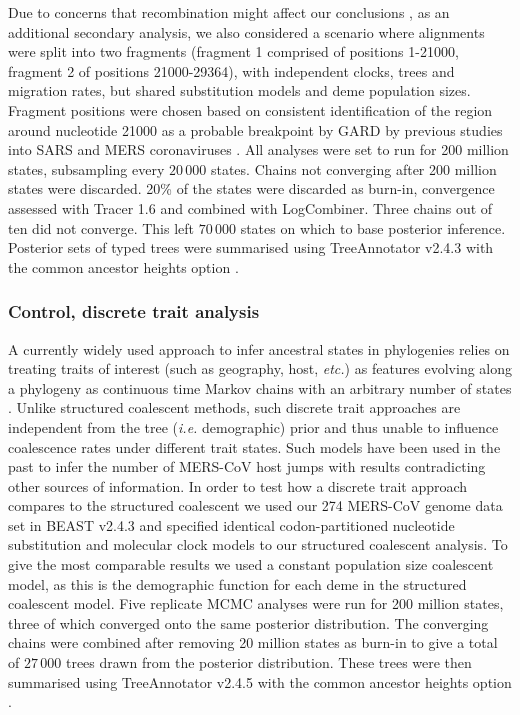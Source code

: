 \documentclass[11pt,oneside,letterpaper]{article}
\begin{document}
Due to concerns that recombination might affect our conclusions \citep{dudas_mers-cov_2016}, as an additional secondary analysis, we also considered a scenario where alignments were split into two fragments (fragment 1 comprised of positions 1-21000, fragment 2 of positions 21000-29364), with independent clocks, trees and migration rates, but shared substitution models and deme population sizes.
Fragment positions were chosen based on consistent identification of the region around nucleotide 21000 as a probable breakpoint by GARD \citep{pond_gard:_2006} by previous studies into SARS and MERS coronaviruses \citep{hon_evidence_2008,dudas_mers-cov_2016}.
All analyses were set to run for 200 million states, subsampling every $20\,000$ states.
Chains not converging after 200 million states were discarded.
20\% of the states were discarded as burn-in, convergence assessed with Tracer 1.6 and combined with LogCombiner.
Three chains out of ten did not converge.
This left $70\,000$ states on which to base posterior inference.
Posterior sets of typed trees were summarised using TreeAnnotator v2.4.3 with the common ancestor heights option \citep{heled_looking_2013}.

\subsubsection*{Control, discrete trait analysis}

A currently widely used approach to infer ancestral states in phylogenies relies on treating traits of interest (such as geography, host, \textit{etc.}) as features evolving along a phylogeny as continuous time Markov chains with an arbitrary number of states \citep{lemey_bayesian_2009}.
Unlike structured coalescent methods, such discrete trait approaches are independent from the tree (\textit{i.e.} demographic) prior and thus unable to influence coalescence rates under different trait states.
Such models have been used in the past to infer the number of MERS-CoV host jumps \citep{zhang_evolutionary_2016} with results contradicting other sources of information.
In order to test how a discrete trait approach compares to the structured coalescent we used our 274 MERS-CoV genome data set in BEAST v2.4.3 \citep{bouckaert_beast_2014} and specified identical codon-partitioned nucleotide substitution and molecular clock models to our structured coalescent analysis.
To give the most comparable results we used a constant population size coalescent model, as this is the demographic function for each deme in the structured coalescent model.
Five replicate MCMC analyses were run for 200 million states, three of which converged onto the same posterior distribution.
The converging chains were combined after removing 20 million states as burn-in to give a total of $27\,000$ trees drawn from the posterior distribution.
These trees were then summarised using TreeAnnotator v2.4.5 with the common ancestor heights option \citep{heled_looking_2013}.
\end{document}
